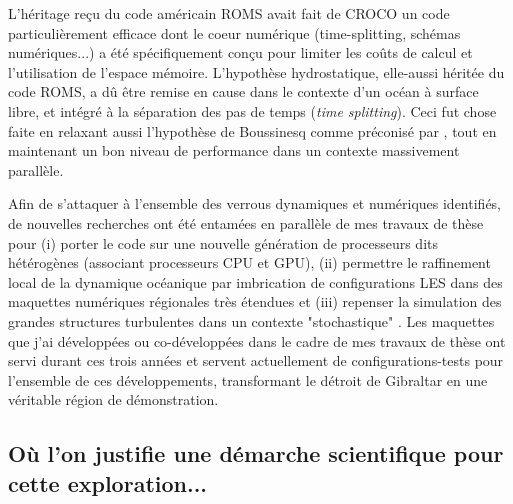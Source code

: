 
L'héritage reçu du code américain ROMS \citep{shchepetkin_regional_2005} avait fait de CROCO un code particulièrement efficace dont le coeur numérique (time-splitting, schémas numériques...) a été spécifiquement conçu pour limiter les coûts de calcul et l'utilisation de l'espace mémoire. L'hypothèse hydrostatique, elle-aussi héritée du code ROMS, a dû être remise en cause dans le contexte d'un océan à surface libre, et intégré à la séparation des pas de temps (\textit{time splitting}). Ceci fut chose faite en relaxant aussi l'hypothèse de Boussinesq comme préconisé par \cite{Auclair2018}, tout en maintenant un bon niveau de performance dans un contexte massivement parallèle.


Afin de s'attaquer à l'ensemble des verrous dynamiques et numériques identifiés, de nouvelles recherches ont été entamées en parallèle de mes travaux de thèse pour (i) porter le code sur une nouvelle génération de processeurs dits hétérogènes (associant processeurs CPU et GPU), (ii) permettre le raffinement local de la dynamique océanique par imbrication de configurations LES dans des maquettes numériques régionales très étendues et (iii) repenser la simulation des grandes structures turbulentes dans un contexte "stochastique" \cite{memin_fluid_2014}. Les maquettes que j'ai développées ou co-développées dans le cadre de mes travaux de thèse ont servi durant ces trois années et servent actuellement de configurations-tests pour l'ensemble de ces développements, transformant le détroit de Gibraltar en une véritable région de démonstration.

\subsection{Où l'on justifie une démarche scientifique pour cette exploration...}


